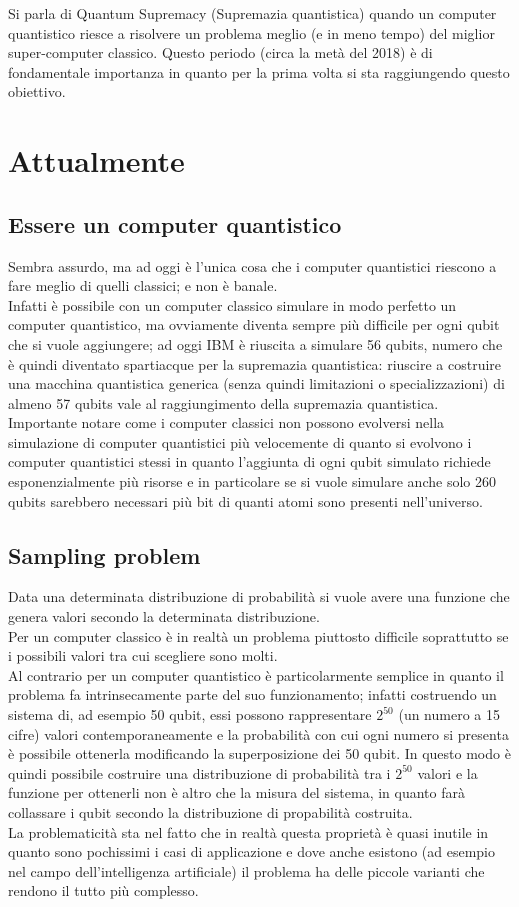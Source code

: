 Si parla di Quantum Supremacy (Supremazia quantistica) quando un computer quantistico riesce a risolvere un problema meglio (e in meno tempo) del miglior super-computer classico. Questo periodo (circa la metà del 2018) è di fondamentale importanza in quanto per la prima volta si sta raggiungendo questo obiettivo.
\section{Attualmente}
\subsection{Essere un computer quantistico}
Sembra assurdo, ma ad oggi è l'unica cosa che i computer quantistici riescono a fare meglio di quelli classici; e non è banale.\\
Infatti è possibile con un computer classico simulare in modo perfetto un computer quantistico, ma ovviamente diventa sempre più difficile per ogni qubit che si vuole aggiungere; ad oggi IBM è riuscita a simulare 56 qubits, numero che è quindi diventato spartiacque per la supremazia quantistica: riuscire a costruire una macchina quantistica generica (senza quindi limitazioni o specializzazioni) di almeno 57 qubits vale al raggiungimento della supremazia quantistica.\\
Importante notare come i computer classici non possono evolversi nella simulazione di computer quantistici più velocemente di quanto si evolvono i computer quantistici stessi in quanto l'aggiunta di ogni qubit simulato richiede esponenzialmente più risorse e in particolare se si vuole simulare anche solo 260 qubits sarebbero necessari più bit di quanti atomi sono presenti nell'universo.
\subsection{Sampling problem}
Data una determinata distribuzione di probabilità si vuole avere una funzione che genera valori secondo la determinata distribuzione.\\
Per un computer classico è in realtà un problema piuttosto difficile soprattutto se i possibili valori tra cui scegliere sono molti.\\
Al contrario per un computer quantistico è particolarmente semplice in quanto il problema fa intrinsecamente parte del suo funzionamento; infatti costruendo un sistema di, ad esempio 50 qubit, essi possono rappresentare $2^{50}$ (un numero a 15 cifre) valori contemporaneamente e la probabilità con cui ogni numero si presenta è possibile ottenerla modificando la superposizione dei 50 qubit. In questo modo è quindi possibile costruire una distribuzione di probabilità tra i $2^{50}$ valori e la funzione per ottenerli non è altro che la misura del sistema, in quanto farà collassare i qubit secondo la distribuzione di propabilità costruita.\\
La problematicità sta nel fatto che in realtà questa proprietà è quasi inutile in quanto sono pochissimi i casi di applicazione e dove anche esistono (ad esempio nel campo dell'intelligenza artificiale) il problema ha delle piccole varianti che rendono il tutto più complesso.
